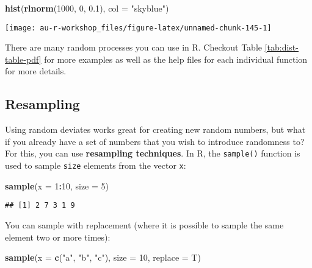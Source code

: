 \documentclass[]{book}
\newenvironment{Shaded}{\begin{snugshade}}{\end{snugshade}}
\newcommand{\KeywordTok}[1]{\textcolor[rgb]{0.13,0.29,0.53}{\textbf{#1}}}
\newcommand{\DataTypeTok}[1]{\textcolor[rgb]{0.13,0.29,0.53}{#1}}
\newcommand{\DecValTok}[1]{\textcolor[rgb]{0.00,0.00,0.81}{#1}}
\newcommand{\FloatTok}[1]{\textcolor[rgb]{0.00,0.00,0.81}{#1}}
\newcommand{\StringTok}[1]{\textcolor[rgb]{0.31,0.60,0.02}{#1}}
\newcommand{\OperatorTok}[1]{\textcolor[rgb]{0.81,0.36,0.00}{\textbf{#1}}}
\newcommand{\NormalTok}[1]{#1}
\theoremstyle{definition}
\theoremstyle{definition}
\theoremstyle{definition}
\theoremstyle{remark}
\begin{document}
\begin{Shaded}
\begin{Highlighting}[]
\KeywordTok{hist}\NormalTok{(}\KeywordTok{rlnorm}\NormalTok{(}\DecValTok{1000}\NormalTok{, }\DecValTok{0}\NormalTok{, }\FloatTok{0.1}\NormalTok{), }\DataTypeTok{col =} \StringTok{"skyblue"}\NormalTok{)}
\end{Highlighting}
\end{Shaded}

\begin{center}\texttt{[image: au-r-workshop\_files/figure-latex/unnamed-chunk-145-1]} \end{center}

There are many random processes you can use in R. Checkout Table
\ref{tab:dist-table-pdf} for more examples as well as the help files for
each individual function for more details.

\subsection{Resampling}\label{resampling}

Using random deviates works great for creating new random numbers, but
what if you already have a set of numbers that you wish to introduce
randomness to? For this, you can use \textbf{resampling techniques}. In
R, the \texttt{sample()} function is used to sample \texttt{size}
elements from the vector \texttt{x}:

\begin{Shaded}
\begin{Highlighting}[]
\KeywordTok{sample}\NormalTok{(}\DataTypeTok{x =} \DecValTok{1}\OperatorTok{:}\DecValTok{10}\NormalTok{, }\DataTypeTok{size =} \DecValTok{5}\NormalTok{)}
\end{Highlighting}
\end{Shaded}

\begin{verbatim}
## [1] 2 7 3 1 9
\end{verbatim}

You can sample with replacement (where it is possible to sample the same
element two or more times):

\begin{Shaded}
\begin{Highlighting}[]
\KeywordTok{sample}\NormalTok{(}\DataTypeTok{x =} \KeywordTok{c}\NormalTok{(}\StringTok{"a"}\NormalTok{, }\StringTok{"b"}\NormalTok{, }\StringTok{"c"}\NormalTok{), }\DataTypeTok{size =} \DecValTok{10}\NormalTok{, }\DataTypeTok{replace =}\NormalTok{ T)}
\end{Highlighting}
\end{Shaded}
\end{document}
